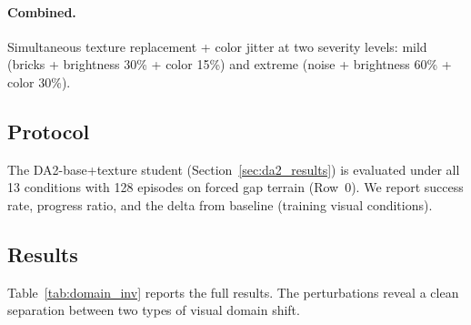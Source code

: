\paragraph{Combined.}
Simultaneous texture replacement + color jitter at two severity
levels: mild (bricks + brightness 30\% + color 15\%) and extreme
(noise + brightness 60\% + color 30\%).

\subsection{Protocol}

The DA2-base+texture student (Section~\ref{sec:da2_results}) is
evaluated under all 13 conditions with 128 episodes on forced gap
terrain (Row~0).  We report success rate, progress ratio, and
the delta from baseline (training visual conditions).

\subsection{Results}

Table~\ref{tab:domain_inv} reports the full results.  The
perturbations reveal a clean separation between two types of
visual domain shift.


